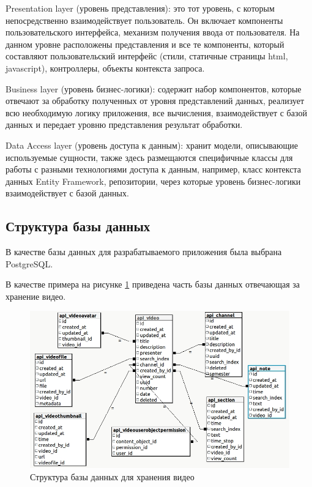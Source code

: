 Presentation layer (уровень представления): это тот уровень, с которым непосредственно
взаимодействует пользователь. Он включает компоненты пользовательского интерфейса, механизм
получения ввода от пользователя. На данном уровне расположены представления и все те компоненты,
который составляют пользовательский интерфейс (стили, статичные страницы html, javascript),
контроллеры, объекты контекста запроса.

Business layer (уровень бизнес-логики): содержит набор компонентов, которые отвечают
за обработку полученных от уровня представлений данных, реализует всю необходимую
логику приложения, все вычисления, взаимодействует с базой данных и передает уровню
представления результат обработки.

Data Access layer (уровень доступа к данным): хранит модели, описывающие используемые сущности,
также здесь размещаются специфичные классы для работы с разными технологиями доступа к данным,
например, класс контекста данных Entity Framework, репозитории, через которые уровень
бизнес-логики взаимодействует с базой данных.

\subsection{Структура базы данных}

В качестве базы данных для разрабатываемого приложения была выбрана PostgreSQL.

В качестве примера на рисунке \ref{db} приведена часть базы данных отвечающая за хранение
видео.

\begin{figure}
  \centering
  \includegraphics[width=1\textwidth]{images/db.jpg}
  \caption{Структура базы данных для хранения видео\label{db}}
\end{figure}


